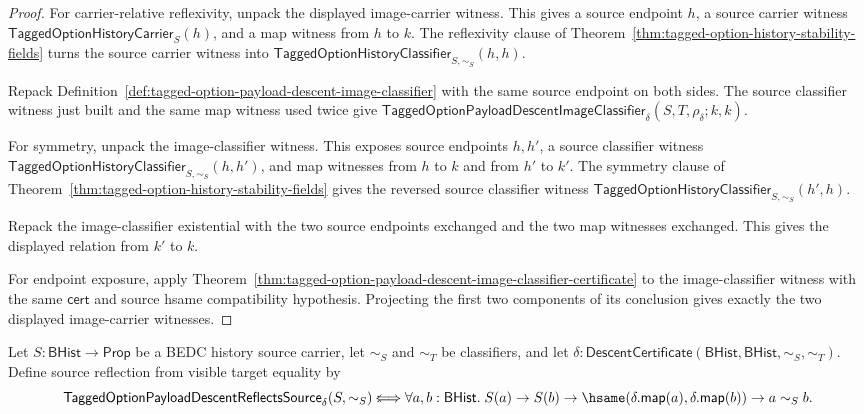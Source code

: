 \begin{proof}
For carrier-relative reflexivity, unpack the displayed image-carrier witness.
This gives a source endpoint $h$, a source carrier witness
$\mathsf{TaggedOptionHistoryCarrier}_S(h)$, and a map witness from $h$ to $k$.
The reflexivity clause of
Theorem~\ref{thm:tagged-option-history-stability-fields} turns the source
carrier witness into
$\mathsf{TaggedOptionHistoryClassifier}_{S,\sim_S}(h,h)$.

Repack Definition~\ref{def:tagged-option-payload-descent-image-classifier} with
the same source endpoint on both sides. The source classifier witness just built
and the same map witness used twice give
$\mathsf{TaggedOptionPayloadDescentImageClassifier}_{\delta}
(S,T,\rho_{\delta};k,k)$.

For symmetry, unpack the image-classifier witness. This exposes source endpoints
$h,h'$, a source classifier witness
$\mathsf{TaggedOptionHistoryClassifier}_{S,\sim_S}(h,h')$, and map witnesses
from $h$ to $k$ and from $h'$ to $k'$. The symmetry clause of
Theorem~\ref{thm:tagged-option-history-stability-fields} gives the reversed
source classifier witness
$\mathsf{TaggedOptionHistoryClassifier}_{S,\sim_S}(h',h)$.

Repack the image-classifier existential with the two source endpoints exchanged
and the two map witnesses exchanged. This gives the displayed relation from
$k'$ to $k$.

For endpoint exposure, apply
Theorem~\ref{thm:tagged-option-payload-descent-image-classifier-certificate} to
the image-classifier witness with the same $\mathsf{cert}$ and source hsame
compatibility hypothesis. Projecting the first two components of its conclusion
gives exactly the two displayed image-carrier witnesses.
\end{proof}

\begin{definition}
\label{def:tagged-option-payload-descent-reflects-source}
Let $S:\mathsf{BHist}\to\mathsf{Prop}$ be a BEDC history source carrier, let
$\sim_S$ and $\sim_T$ be classifiers, and let
$\delta:\mathsf{DescentCertificate}(\mathsf{BHist},\mathsf{BHist},\sim_S,\sim_T)$.
Define source reflection from visible target equality by
$$
\mathsf{TaggedOptionPayloadDescentReflectsSource}_{\delta}(S,\sim_S)
:\!\!\Longleftrightarrow
\forall a,b:\mathsf{BHist}.\;
S(a)\to S(b)\to
\hsame(\delta.\mathsf{map}(a),\delta.\mathsf{map}(b))\to
a\sim_S b.
$$
\end{definition}

